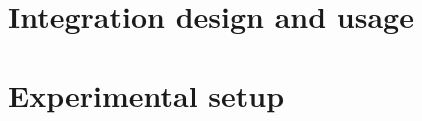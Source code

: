 

\section{Integration design and usage}
    \label{sec:integration_design_and_usage}
    

\section{Experimental setup}
    \label{sec:experimental_setup}
    